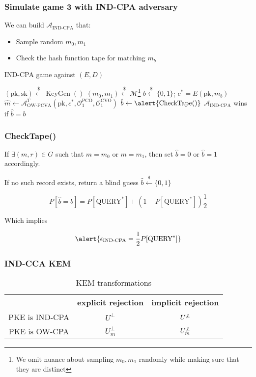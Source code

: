 \documentclass{beamer}
\newcommand{\leftsample}{\overset{{\scriptscriptstyle\$}}{\leftarrow}}
\begin{document}
\begin{frame}
    \frametitle{Simulate game 3 with IND-CPA adversary}

    We can build $\mathcal{A}_\text{IND-CPA}$ that:
    \begin{itemize}
        \item Sample random $m_0, m_1$
        \item Check the hash function tape for matching $m_b$
    \end{itemize}

    \begin{algorithm}[H]
        \SetAlgoLined
        \caption{IND-CPA game against $(E, D)$}

        $(\text{pk}, \text{sk}) \leftsample \operatorname{KeyGen}()$\;
        $(m_0, m_1) \leftsample \mathcal{M}$\footnote{
            We omit nuance about sampling $m_0, m_1$ randomly while making sure that they are distinct
        }\;
        $b \leftsample \{0,1\}$; $c^\ast = E(\text{pk}, m_b)$\;
        $\hat{m} \leftarrow \mathcal{A}^T_\text{OW-PCVA}(
            \text{pk}, c^\ast, \mathcal{O}^\text{PCO}_1, \mathcal{O}^\text{CVO}_1
        )$\;
        $\hat{b} \leftarrow \alert{\operatorname{CheckTape()}}$\;
        $\mathcal{A}_\text{IND-CPA}$ wins if $\hat{b} = b$\;
    \end{algorithm}
\end{frame}

\begin{frame}
    \frametitle{CheckTape()}

    If $\exists(m,r) \in G$ such that $m = m_0$ or $m = m_1$, then set $\hat{b} = 0$ or $\hat{b} = 1$ accordingly.

    If no such record exists, return a blind guess $\hat{b} \leftsample \{0,1\}$

    \begin{equation*}
        P[\hat{b} = b] = P[\text{QUERY}^\ast]
            + (1 - P[\text{QUERY}^\ast])\frac{1}{2}
    \end{equation*}

    Which implies

    \begin{equation*}
        \alert{\epsilon_\text{IND-CPA} = \frac{1}{2}P[\text{QUERY}^\ast]}
    \end{equation*}
\end{frame}

\begin{frame}
    \frametitle{IND-CCA KEM}

    \begin{table}
        \centering
        \begin{tabular}{|c|c|c|}
        \hline
        & explicit rejection & implicit rejection \\
        \hline
        PKE is IND-CPA & $U^\bot$ & $U^{\not\bot}$ \\
        PKE is OW-CPA & $U^\bot_m$ & $U^{\not\bot}_m$ \\
        \hline
        \end{tabular}
        \caption{KEM transformations}
    \end{table}
\end{frame}
\end{document}
